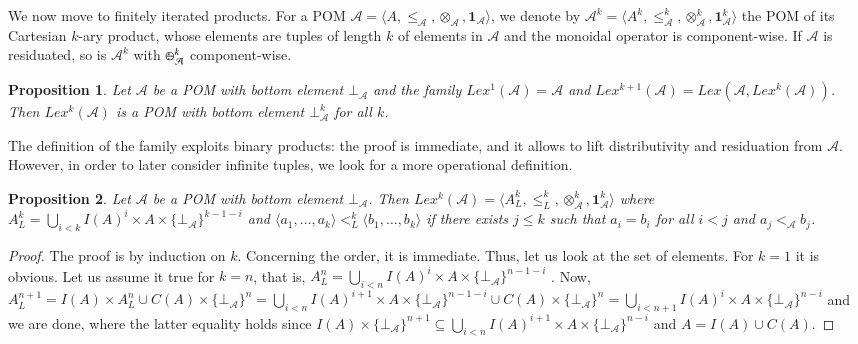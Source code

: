 \documentclass[a4paper]{elsarticle}
\newtheorem{proposition}{Proposition}
\newcommand{\monop}{\otimes}
\newcommand{\1}{\mathbf{1}}
\def\odiv{{ \ominus\hspace{-8pt}:}\;}
\begin{document}
We now move to finitely iterated products. For a POM 
$\mathcal{A} = \langle A, \leq_\mathcal{A}, \monop_\mathcal{A}, \1_\mathcal{A} \rangle$, 
we denote by $\mathcal{A}^k =  \langle A^k, \leq^k_\mathcal{A}, \monop^k_\mathcal{A}, \1^k_\mathcal{A} \rangle$
the POM of its Cartesian $k$-ary product, whose elements are tuples of length $k$
of elements in $\mathcal{A}$ and the monoidal operator is component-wise.
%
If $\mathcal{A}$ is residuated, so is $\mathcal{A}^k$ with $\odiv^k_\mathcal{A}$ component-wise.

\begin{proposition}\label{def:lexilist}
	Let $\mathcal{A}$ be a POM with bottom element $\bot_\mathcal{A}$
	and the family 
	$Lex^1(\mathcal{A}) = \mathcal{A}$ and $Lex^{k+1}(\mathcal{A}) = Lex(\mathcal{A}, Lex^k(\mathcal{A}))$.
	Then $Lex^k(\mathcal{A})$ is a POM with bottom element $\bot^k_\mathcal{A}$ for all $k$.
\end{proposition}

The definition of the family exploits binary products: the proof is immediate,
and it allows to lift distributivity and residuation from $\mathcal{A}$.
However, in order to later consider infinite tuples, we look for 
a more operational definition. %

\begin{proposition}\label{pomLex}
	Let $\mathcal{A}$ be a POM with bottom element $\bot_\mathcal{A}$.
	Then $Lex^{k}(\mathcal{A}) = \langle A^k_L, \leq^k_L, \monop^k_\mathcal{A}, \1^k_\mathcal{A} \rangle$
	where $A^k_L = \bigcup_{i < k}I(A)^i \times A \times \{\bot_\mathcal{A}\}^{k-1-i}$
	and $\langle a_1, \ldots, a_k\rangle <^k_L \langle b_1, \ldots, b_k\rangle$ if there exists $j \leq k$ such that
	$a_i = b_i$ for all $i < j$ and %
	$a_{j} <_\mathcal{A}  b_{j}$.
\end{proposition}
\begin{proof}
	The proof is by induction on $k$. Concerning the order, it is immediate.
	Thus, let us look at the set of elements. For $k = 1$ it is obvious.
	Let us assume it true for $k = n$, that is,
	$A^n_L = \bigcup_{i < n}I(A)^i \times A \times \{\bot_\mathcal{A}\}^{n-1-i}$ .
	Now, 
	$A^{n+1}_L =  I(A) \times A^{n}_L  \cup C(A) \times \{\bot_\mathcal{A}\}^{n} =
	\bigcup_{i < n}I(A)^{i+1} \times A \times \{\bot_\mathcal{A}\}^{n-1-i} \cup C(A) \times \{\bot_\mathcal{A}\}^{n} = %
	\bigcup_{i < n+1}I(A)^{i} \times A \times \{\bot_\mathcal{A}\}^{n-i}$
	and we are done, where the latter equality holds since
	$I(A) \times \{\bot_\mathcal{A}\}^{n+1} \subseteq \bigcup_{i < n}I(A)^{i+1} \times A \times \{\bot_\mathcal{A}\}^{n-i}$
	and $A = I(A) \cup C(A)$.
\end{proof}
\end{document}
